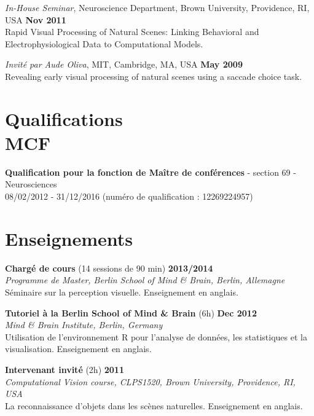 \documentclass[margin,line]{resume}
\begin{document}
\begin{resume}
	\vspace{-2mm} 
	\textit{In-House Seminar}, Neuroscience Department, Brown University, Providence, RI, USA \hfill \textbf{Nov 2011}\\
	Rapid Visual Processing of Natural Scenes: Linking Behavioral and Electrophysiological Data to Computational Models.

	\vspace{-2mm} 
	\textit{Invité par Aude Oliva}, MIT, Cambridge, MA, USA \hfill \textbf{May 2009}\\
	Revealing early visual processing of natural scenes using a saccade choice task.

	\normalsize

\vspace{3mm}
\section{\mysidestyle Qualifications\\MCF}
    \textbf{Qualification pour la fonction de Maître de conférences} - section 69 - Neurosciences\\
    08/02/2012 - 31/12/2016 (numéro de qualification : 12269224957)
    
    
\vspace{3mm}
\section{\mysidestyle Enseignements}
	
	\textbf{Chargé de cours} (14 sessions de 90 min) \hfill \textbf{2013/2014}\\
	\textsl{Programme de Master, Berlin School of Mind \& Brain, Berlin, Allemagne}\\
	Séminaire sur la perception visuelle. Enseignement en anglais.
	
	\vspace{-2mm}
	\textbf{Tutoriel à la Berlin School of Mind \& Brain} (6h) \hfill \textbf{Dec 2012}\\
	\textsl{Mind \& Brain Institute, Berlin, Germany}\\
	Utilisation de l'environnement R pour l'analyse de données, les statistiques et la visualisation.  Enseignement en anglais.

\newpage

	\vspace{-2mm} 
	\textbf{Intervenant invité} (2h) \hfill \textbf{2011}\\
	\textsl{Computational Vision course, CLPS1520, Brown University, Providence, RI, USA}\\
	La reconnaissance d'objets dans les scènes naturelles. Enseignement en anglais.


\end{resume}
\end{document}
